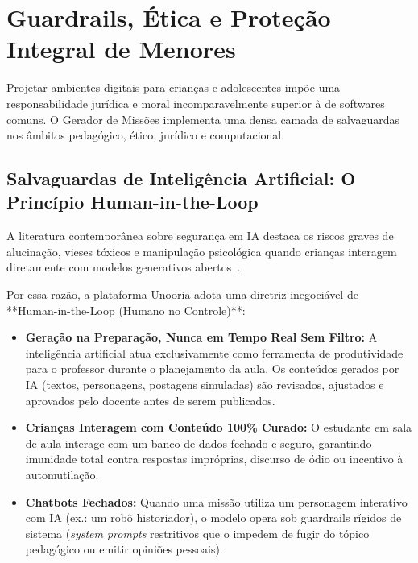 \documentclass[11pt,a4paper]{article}
\begin{document}
\section{Guardrails, Ética e Proteção Integral de Menores}
\label{sec:guardrails}

Projetar ambientes digitais para crianças e adolescentes impõe uma responsabilidade jurídica e moral incomparavelmente superior à de softwares comuns. O Gerador de Missões implementa uma densa camada de salvaguardas nos âmbitos pedagógico, ético, jurídico e computacional.

\subsection{Salvaguardas de Inteligência Artificial: O Princípio Human-in-the-Loop}
A literatura contemporânea sobre segurança em IA destaca os riscos graves de alucinação, vieses tóxicos e manipulação psicológica quando crianças interagem diretamente com modelos generativos abertos~\cite{bommasani2021opportunities}.

Por essa razão, a plataforma Unooria adota uma diretriz inegociável de **Human-in-the-Loop (Humano no Controle)**:
\begin{itemize}
  \item \textbf{Geração na Preparação, Nunca em Tempo Real Sem Filtro:} A inteligência artificial atua exclusivamente como ferramenta de produtividade para o professor durante o planejamento da aula. Os conteúdos gerados por IA (textos, personagens, postagens simuladas) são revisados, ajustados e aprovados pelo docente antes de serem publicados.
  \item \textbf{Crianças Interagem com Conteúdo 100\% Curado:} O estudante em sala de aula interage com um banco de dados fechado e seguro, garantindo imunidade total contra respostas impróprias, discurso de ódio ou incentivo à automutilação.
  \item \textbf{Chatbots Fechados:} Quando uma missão utiliza um personagem interativo com IA (ex.: um robô historiador), o modelo opera sob guardrails rígidos de sistema (\textit{system prompts} restritivos que o impedem de fugir do tópico pedagógico ou emitir opiniões pessoais).
\end{itemize}
\end{document}
